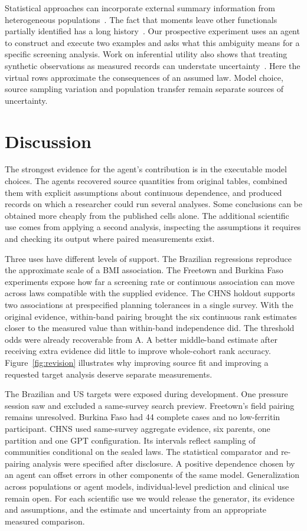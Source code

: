 \documentclass[sigconf,anonymous,review]{acmart}
\begin{document}
Statistical approaches can incorporate external summary information from heterogeneous populations~\cite{syndi}. The fact that moments leave other functionals partially identified has a long history~\cite{bounds}. Our prospective experiment uses an agent to construct and execute two examples and asks what this ambiguity means for a specific screening analysis. Work on inferential utility also shows that treating synthetic observations as measured records can understate uncertainty~\cite{inferential}. Here the virtual rows approximate the consequences of an assumed law. Model choice, source sampling variation and population transfer remain separate sources of uncertainty.

\section{Discussion}
The strongest evidence for the agent's contribution is in the executable model choices. The agents recovered source quantities from original tables, combined them with explicit assumptions about continuous dependence, and produced records on which a researcher could run several analyses. Some conclusions can be obtained more cheaply from the published cells alone. The additional scientific use comes from applying a second analysis, inspecting the assumptions it requires and checking its output where paired measurements exist.

Three uses have different levels of support. The Brazilian regressions reproduce the approximate scale of a BMI association. The Freetown and Burkina Faso experiments expose how far a screening rate or continuous association can move across laws compatible with the supplied evidence. The CHNS holdout supports two associations at prespecified planning tolerances in a single survey. With the original evidence, within-band pairing brought the six continuous rank estimates closer to the measured value than within-band independence did. The threshold odds were already recoverable from A. A better middle-band estimate after receiving extra evidence did little to improve whole-cohort rank accuracy. Figure~\ref{fig:revision} illustrates why improving source fit and improving a requested target analysis deserve separate measurements.

The Brazilian and US targets were exposed during development. One pressure session saw and excluded a same-survey search preview. Freetown's field pairing remains unresolved. Burkina Faso had 44 complete cases and no low-ferritin participant. CHNS used same-survey aggregate evidence, six parents, one partition and one GPT configuration. Its intervals reflect sampling of communities conditional on the sealed laws. The statistical comparator and re-pairing analysis were specified after disclosure. A positive dependence chosen by an agent can offset errors in other components of the same model. Generalization across populations or agent models, individual-level prediction and clinical use remain open. For each scientific use we would release the generator, its evidence and assumptions, and the estimate and uncertainty from an appropriate measured comparison.



\appendix

\end{document}
